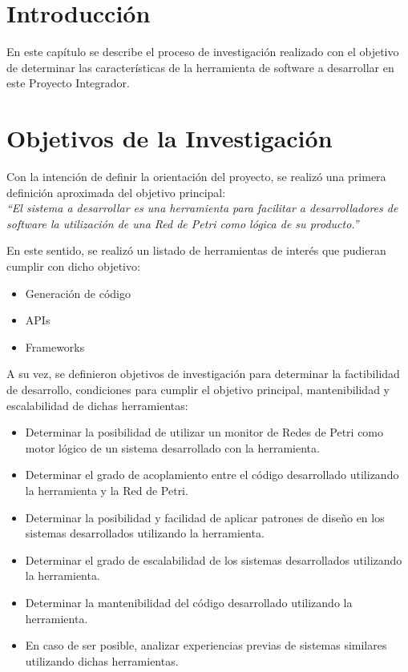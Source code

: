 \section{Introducción}
En este capítulo se describe el proceso de investigación realizado con el
objetivo de determinar las características de la herramienta de software a
desarrollar en este Proyecto Integrador.

\section{Objetivos de la Investigación}
Con la intención de definir la orientación del proyecto, se realizó
una primera definición aproximada del objetivo principal:\\
\emph{``El sistema a desarrollar es una herramienta para facilitar a
desarrolladores de software la utilización de una Red de Petri como lógica de su
producto.''}

En este sentido, se realizó un listado de herramientas de interés que pudieran
cumplir con dicho objetivo:
\begin{itemize}
  \item Generación de código
  \item APIs
  \item Frameworks
\end{itemize}

A su vez, se definieron objetivos de investigación para determinar la
factibilidad de desarrollo, condiciones para cumplir el objetivo principal,
mantenibilidad y escalabilidad de dichas herramientas:
\begin{itemize}
    \item Determinar la posibilidad de utilizar un monitor de Redes de Petri
    como motor lógico de un sistema desarrollado con la herramienta.
    \item Determinar el grado de acoplamiento entre el código desarrollado
    utilizando la herramienta y la Red de Petri.
    \item Determinar la posibilidad y facilidad de aplicar patrones de
    diseño en los sistemas desarrollados utilizando la herramienta.
    \item Determinar el grado de escalabilidad de los sistemas desarrollados
    utilizando la herramienta.
    \item Determinar la mantenibilidad del código desarrollado
    utilizando la herramienta.
    \item En caso de ser posible, analizar experiencias previas de sistemas
    similares utilizando dichas herramientas.
\end{itemize}

